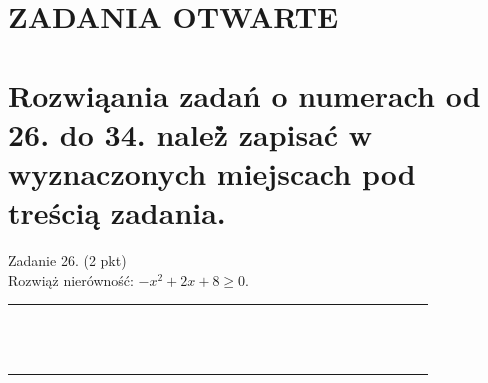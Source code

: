 \documentclass[10pt]{article}
\begin{document}
\section*{ZADANIA OTWARTE}
\section*{Rozwiąania zadań o numerach od 26. do 34. należ̀ zapisać w wyznaczonych miejscach pod treścią zadania.}
Zadanie 26. (2 pkt)\\
Rozwiąż nierówność: \(-x^{2}+2 x+8 \geq 0\).

\begin{center}
\begin{tabular}{|c|c|c|c|c|c|c|c|c|c|c|c|c|c|c|c|c|c|c|c|c|c|c|c|c|c|c|c|c|c|}
\hline
 &  &  &  &  &  &  &  &  &  &  &  &  &  &  &  &  &  &  &  &  &  &  &  &  &  &  &  &  &  \\
\hline
 &  &  &  &  &  &  &  &  &  &  &  &  &  &  &  &  &  &  &  &  &  &  &  &  &  &  &  &  &  \\
\hline
 &  &  &  &  &  &  &  &  &  &  &  &  &  &  &  &  &  &  &  &  &  &  &  &  &  &  &  &  &  \\
\hline
 &  &  &  &  &  &  &  &  &  &  &  &  &  &  &  &  &  &  &  &  &  &  &  &  &  &  &  &  &  \\
\hline
 &  &  &  &  &  &  &  &  &  &  &  &  &  &  &  &  &  &  &  &  &  &  &  &  &  &  &  &  &  \\
\hline
 &  &  &  &  &  &  &  &  &  &  &  &  &  &  &  &  &  &  &  &  &  &  &  &  &  &  &  &  &  \\
\hline
 &  &  &  &  &  &  &  &  &  &  &  &  &  &  &  &  &  &  &  &  &  &  &  &  &  &  &  &  &  \\
\hline
 &  &  &  &  &  &  &  &  &  &  &  &  &  &  &  &  &  &  &  &  &  &  &  &  &  &  &  &  &  \\
\hline
 &  &  &  &  &  &  &  &  &  &  &  &  &  &  &  &  &  &  &  &  &  &  &  &  &  &  &  &  &  \\
\hline
 &  &  &  &  &  &  &  &  &  &  &  &  &  &  &  &  &  &  &  &  &  &  &  &  &  &  &  &  &  \\
\hline
 &  &  &  &  &  &  &  &  &  &  &  &  &  &  &  &  &  &  &  &  &  &  &  &  &  &  &  &  &  \\
\hline
 &  &  &  &  &  &  &  &  &  &  &  &  &  &  &  &  &  &  &  &  &  &  &  &  &  &  &  &  &  \\
\hline
 &  &  &  &  &  &  &  &  &  &  &  &  &  &  &  &  &  &  &  &  &  &  &  &  &  &  &  &  &  \\
\hline
 &  &  &  &  &  &  &  &  &  &  &  &  &  &  &  &  &  &  &  &  &  &  &  &  &  &  &  &  &  \\

\end{tabular}
\end{center}
\end{document}
